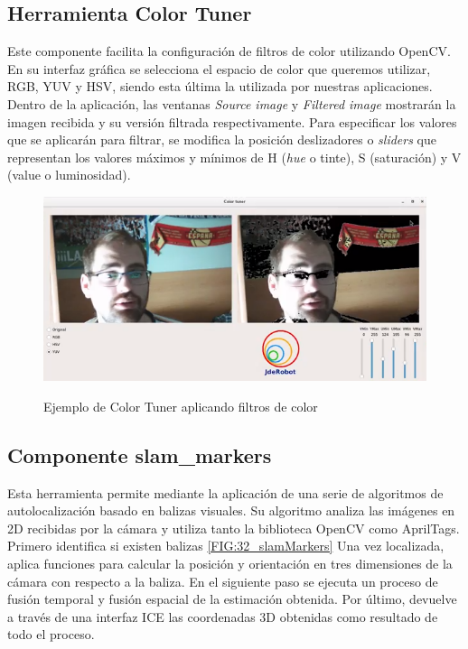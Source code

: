 {	\subsection{Herramienta Color Tuner}
	\label{subsec:colorTuner}
	Este componente facilita la configuración de filtros de color utilizando OpenCV. En su interfaz gráfica se selecciona el espacio de color que queremos utilizar, RGB, YUV y HSV, siendo esta última la utilizada por nuestras aplicaciones. Dentro de la aplicación, las ventanas \textit{Source image} y \textit{Filtered image} mostrarán la imagen recibida y su versión filtrada respectivamente. Para especificar los valores que se aplicarán para filtrar, se modifica la posición deslizadores o \textit{sliders} que representan los valores máximos y mínimos de H (\textit{hue} o tinte), S (saturación) y V (value o luminosidad).
	
	
	\begin{figure}[H]
		\centering
		{\includegraphics[scale=0.55]{imag/colortuner.png}}
		\caption{Ejemplo de Color Tuner aplicando filtros de color}
		
		\label{FIG:32_colorTuner}
	\end{figure}
	
	
	\subsection{Componente slam\_markers}
	\label{subsec:slam Markers}
	
	Esta herramienta permite mediante la aplicación de una serie de algoritmos de autolocalización basado en balizas visuales. Su algoritmo analiza las imágenes en 2D recibidas por la cámara y utiliza tanto la biblioteca OpenCV como AprilTags. Primero identifica si existen balizas \ref{FIG:32_slamMarkers} Una vez localizada, aplica funciones para calcular la posición y orientación en tres dimensiones de la cámara con respecto a la baliza. En el siguiente paso se ejecuta un proceso de fusión temporal y fusión espacial de la estimación obtenida. Por último, devuelve a través de una interfaz ICE las coordenadas 3D obtenidas como resultado de todo el proceso.
	 
}

